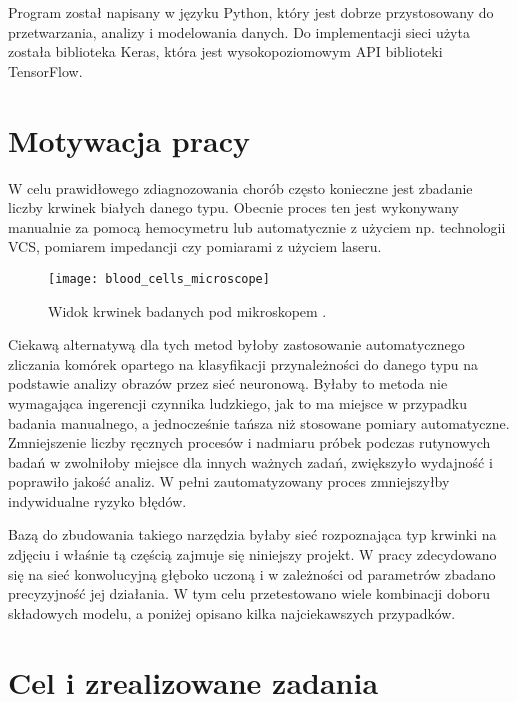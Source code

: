 Program został napisany w języku Python, który jest dobrze przystosowany do przetwarzania, analizy i modelowania danych. Do implementacji sieci użyta została biblioteka Keras, która jest wysokopoziomowym API biblioteki TensorFlow.

\section{Motywacja pracy}
\label{sec:motywacja_pracy}

W celu prawidłowego zdiagnozowania chorób często konieczne jest zbadanie liczby krwinek białych danego typu. Obecnie proces ten jest wykonywany manualnie za pomocą hemocymetru lub automatycznie z użyciem np. technologii VCS, pomiarem impedancji czy pomiarami z użyciem laseru. 

\begin{figure}[h]
	\centering
		\texttt{[image: blood\_cells\_microscope]}
	\caption{Widok krwinek badanych pod mikroskopem \cite{cells_microscope}.}
\end{figure}

Ciekawą alternatywą dla tych metod byłoby zastosowanie automatycznego zliczania komórek opartego na klasyfikacji przynależności do danego typu na podstawie analizy obrazów przez sieć neuronową. Byłaby to metoda nie wymagająca ingerencji czynnika ludzkiego, jak to ma miejsce w przypadku badania manualnego, a jednocześnie tańsza niż stosowane pomiary automatyczne. Zmniejszenie liczby ręcznych procesów i nadmiaru próbek podczas rutynowych badań w zwolniłoby miejsce dla innych ważnych zadań, zwiększyło wydajność i poprawiło jakość analiz. W pełni zautomatyzowany proces zmniejszyłby indywidualne ryzyko błędów.

Bazą do zbudowania takiego narzędzia byłaby sieć rozpoznająca typ krwinki na zdjęciu i właśnie tą częścią zajmuje się niniejszy projekt. W pracy zdecydowano się na sieć konwolucyjną głęboko uczoną i w zależności od parametrów zbadano precyzyjność jej działania. W tym celu przetestowano wiele kombinacji doboru składowych modelu, a poniżej opisano kilka najciekawszych przypadków.

\section{Cel i zrealizowane zadania}
\label{sec:cel_i_zrealizowane_zadania}

